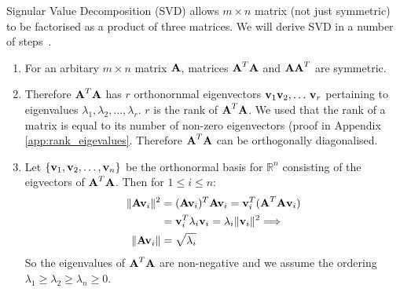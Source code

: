 \documentclass[a4paper]{article}
\numberwithin{equation}{section} %
\newcommand{\setRn}{\mathbb{R}^n} %
\newcommand{\norm}[1] {\lVert #1 \rVert} %
\newcommand{\B}[1]{\textbf{\textup{#1}}} %
\newcommand{\emphasis}[1]{\textls{#1}}
\begin{document}
Signular Value Decomposition (SVD) allows \emphasis{any} $m \times n$ matrix (not just symmetric) to be factorised as a product of three matrices. We will derive SVD in a number of steps~\cite{seminar_bast}.
\begin{enumerate}
\item For an arbitary $m \times n$ matrix $\B{A}$, matrices $\B{A}^{T}\B{A}$ and $\B{A}\B{A}^T$ are symmetric.
\item Therefore $\B{A}^T\B{A}$ has $r$ orthonornmal eigenvectors $\B{v}_1\B{v}_2,\ldots\, \B{v}_r$ pertaining to eigenvalues $\lambda_1, \lambda_2, \ldots, \lambda_r$. $r$ is the rank of $\B{A}^T\B{A}$. We used that the rank of a matrix is equal to its number of non-zero eigenvectors (proof in Appendix \ref{app:rank_eigevalues}. Therefore $\B{A}^T\B{A}$ can be orthogonally diagonalised.
\item Let $\{\B{v}_1,\B{v}_2,\ldots,\B{v}_n\}$ be the orthonormal basis for $\setRn$ consisting of the eigvectors of $\B{A}^T\B{A}$. Then for $1 \leq i \leq n$:
\[
\begin{split}
\norm{\B{Av}_i}^2 &= (\B{Av}_i)^T \B{Av}_i = \B{v}_i^T (\B{A}^T \B{A}\B{v}_i) \\
&= \B{v}_i^T \lambda_i \B{v}_i = \lambda_i \norm{\B{v}_i}^2 \Longrightarrow \\
\norm{\B{Av}_i} &= \sqrt{\lambda_i}
\end{split}
\]
So the eigenvalues of $\B{A}^T\B{A}$ are non-negative and we assume the ordering $\lambda_1 \geq \lambda_2 \geq \lambda_n \geq 0$.


\end{enumerate}
\end{document}
